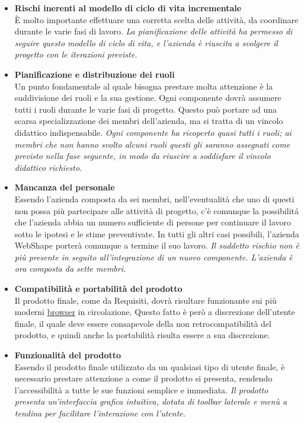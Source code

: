 \begin{itemize}
\item \textbf{Rischi inerenti al modello di ciclo di vita incrementale}\\
\`E molto importante effettuare una corretta scelta delle attivit\`a, da coordinare durante le varie fasi di lavoro. \textit{La pianificazione delle attivit\`a ha permesso di seguire questo modello di ciclo di vita, e l'azienda \`e riuscita a svolgere il progetto con le iterazioni previste.}
\item \textbf{Pianificazione e distribuzione dei ruoli}\\
Un punto fondamentale al quale bisogna prestare molta attenzione \`e la suddivisione dei ruoli e la sua gestione. Ogni componente dovr\`a assumere tutti i ruoli durante le varie fasi di progetto. Questo pu\`o portare ad una scarsa specializzazione dei membri dell'azienda, ma si tratta di un vincolo didattico indispensabile. \textit{Ogni componente ha ricoperto quasi tutti i ruoli; ai membri che non hanno svolto alcuni ruoli questi gli saranno assegnati come previsto nella fase seguente, in modo da riuscire a soddisfare il vincolo didattico richiesto.}
\item \textbf{Mancanza del personale}\\
Essendo l'azienda composta da sei membri, nell'eventualit\`a che uno di questi non possa pi\`u partecipare alle attivit\`a di progetto, c'\`e comunque la possibilit\'a che l'azienda abbia un numero sufficiente di persone per continuare il lavoro sotto le ipotesi e le stime preventivate. In tutti gli altri casi possibili, l'azienda WebShape porter\`a comunque a termine il suo lavoro. \textit{Il suddetto rischio non \`e pi\`u presente in seguito all'integrazione di un nuovo componente. L'azienda \`e ora composta da sette membri.}
\item \textbf{Compatibilit\`a e portabilit\`a del prodotto}\\
Il prodotto finale, come da Requisiti, dovr\`a risultare funzionante sui pi\`u moderni {\underline{browser}} in circolazione. Questo fatto \`e per\`o  a discrezione dell'utente finale, il quale deve essere consapevole della non retrocompatibilit\`a del prodotto, e quindi anche la portabilit\`a risulta essere  a sua discrezione.
\item \textbf{Funzionalit\`a del prodotto}\\
Essendo il prodotto finale utilizzato da un qualsiasi tipo di utente finale, \`e necessario prestare attenzione a come il prodotto si presenta, rendendo l'accessibilit\`a a tutte le sue funzioni semplice e immediata. \textit{Il prodotto presenta un'interfaccia grafica intuitiva, dotata di toolbar laterale e men\`u a tendina per facilitare l'interazione con l'utente.}
\end{itemize}			


